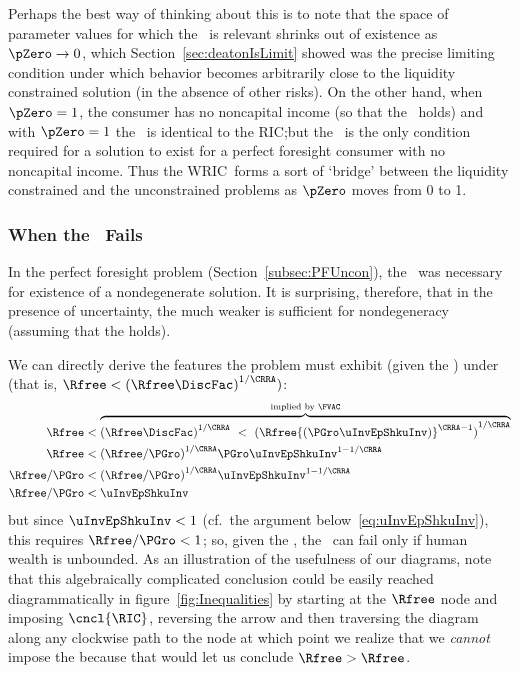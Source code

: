 \documentclass[BufferStockTheory]{subfiles}
\begin{document}
Perhaps the best way of thinking about this is to note that the space of parameter values for which the \WRIC~is relevant shrinks out of existence as $\pZero \rightarrow 0$, which Section~\ref{sec:deatonIsLimit} showed was the precise limiting condition under which behavior becomes arbitrarily close to the liquidity constrained solution (in the absence of other risks).  On the other hand, when $\pZero = 1$, the consumer has no noncapital income (so that the \FHWC~holds) and with $\pZero=1$ the \WRIC~is identical to the RIC;\@ but the \RIC~is the only condition required for a solution to exist for a perfect foresight consumer with no noncapital income.  Thus the WRIC~forms a sort of `bridge' between the liquidity constrained and the unconstrained problems as $\pZero$ moves from 0 to 1.

\hypertarget{IntuitionRIC}{}
\subsubsection{When the \RIC~Fails}\label{subsubsec:WhenTheRICFails}

In the perfect foresight problem (Section~\ref{subsec:PFUncon}), the \RIC~was necessary for existence of a nondegenerate solution.  It is surprising, therefore, that in the presence of uncertainty, the much weaker {\WRIC} is sufficient for nondegeneracy (assuming that the {\FVAC} holds).
\begin{comment}
  But if the \RIC~does hold, some useful results can be derived.  Arguably
  the most fundamental are that the limiting values
  for the minimal and maximal marginal propensities to consume implicit in
 ~\eqref{eq:MaxMPCInv} and~\eqref{eq:MinMPCInv} are positive and finite.
\end{comment}
We can directly derive the features the problem must
exhibit (given the \FVAC) under \cncl{\RIC} (that is, $\Rfree < {(\Rfree \DiscFac)}^{1/\CRRA})$:
\begin{align}
  \Rfree   & < \overbrace{{(\Rfree \DiscFac)}^{1/\CRRA} ~ < ~ {(\Rfree {(\PGro \uInvEpShkuInv)}^{\CRRA-1})}^{1/\CRRA}}^{\text{implied by \FVAC}} \notag
  \\  \Rfree   & < {(\Rfree/\PGro)}^{1/\CRRA}\PGro \uInvEpShkuInv^{1-1/\CRRA} \notag
  \\  \Rfree/\PGro  & < {(\Rfree/\PGro)}^{1/\CRRA}\uInvEpShkuInv^{1-1/\CRRA} \notag
  \\  \Rfree/\PGro  & < \uInvEpShkuInv \label{eq:RICimplies}
\end{align}
but since $\uInvEpShkuInv < 1$ (cf.\ the argument below~\eqref{eq:uInvEpShkuInv}), this requires $\Rfree/\PGro < 1$; so, given the \FVAC, the \RIC~can fail only if human wealth is unbounded.  As an illustration of the usefulness of our diagrams, note that this algebraically complicated conclusion could be easily reached diagrammatically in figure~\ref{fig:Inequalities} by starting at the $\Rfree$ node and imposing $\cncl{\RIC}$, reversing the {\RIC} arrow and then traversing the diagram along any clockwise path to the {\PFVAF} node at which point we realize that we \textit{cannot} impose the {\FHWC} because that would let us conclude $\Rfree > \Rfree$.
\end{document}
